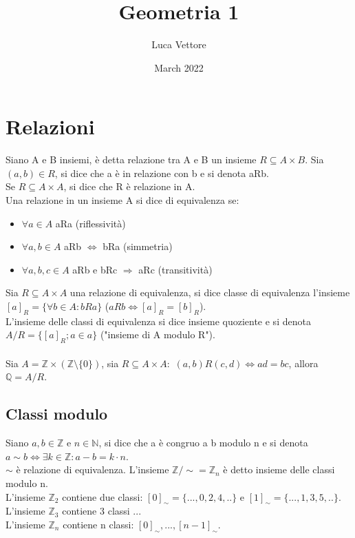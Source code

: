 \documentclass{article}
\title{Geometria 1}
\author{Luca Vettore}
\date{March 2022}
\begin{document}
\maketitle

\section{Relazioni}
Siano A e B insiemi, è detta relazione tra A e B un insieme $R\subseteq A\times B$. Sia $(a,b)\in R$, si dice che a è in relazione con b e si denota aRb.\\
Se $R\subseteq A\times A$, si dice che R è relazione in A.\\
Una relazione in un insieme A si dice di equivalenza se:
\begin{itemize}
    \item $\forall a\in A$ aRa (riflessività)
    \item $\forall a,b\in A$ aRb $\Leftrightarrow$ bRa (simmetria)
    \item $\forall a,b,c\in A$ aRb e bRc $\Rightarrow$ aRc (transitività)
\end{itemize}
Sia $R\subseteq A\times A$ una relazione di equivalenza, si dice classe di equivalenza l'insieme $[a]_R=\{\forall b\in A: bRa\}$ ($aRb\Leftrightarrow[a]_R=[b]_R$).\\
L'insieme delle classi di equivalenza si dice insieme quoziente e si denota $A/R=\{[a]_R;a\in a\}$ ("insieme di A modulo R").\\\\
Sia $A=\mathds{Z}\times(\mathds{Z}\setminus\{0\})$, sia $R\subseteq A\times A:$ $(a,b)R(c,d)\Leftrightarrow ad=bc$, allora $\mathds{Q}=A/R$.

\subsection{Classi modulo}
Siano $a,b\in\mathds{Z}$ e $n\in\mathds{N}$, si dice che a è congruo a b modulo n e si denota $a\sim b\Leftrightarrow\exists k\in\mathds{Z}:a-b=k\cdot n$.\\
$\sim$ è relazione di equivalenza.
L'insieme $\mathds{Z}/\sim=\mathds{Z}_n$ è detto insieme delle classi modulo n.\\
L'insieme $\mathds{Z}_2$ contiene due classi: $[0]_\sim=\{...,0,2,4,..\}$ e $[1]_\sim=\{...,1,3,5,..\}$.\\
L'insieme $\mathds{Z}_3$ contiene 3 classi ...\\
L'insieme $\mathds{Z}_n$ contiene n classi: $[0]_\sim,...,[n-1]_\sim$.
\end{document}

